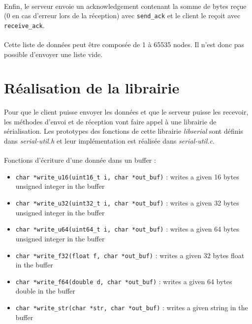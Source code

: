 \documentclass{article}
\begin{document}
    \paragraph{}
    Enfin, le serveur envoie un acknowledgement contenant la somme de bytes reçue (0 en cas d'erreur lors de la réception) avec \texttt{send\_ack} et le client le reçoit avec \texttt{receive\_ack}.

    \paragraph{}
    Cette liste de données peut être composée de 1 à 65535 nodes. Il n'est donc pas possible d'envoyer une liste vide.


    \section{Réalisation de la librairie}
    \paragraph{}
    Pour que le client puisse envoyer les données et que le serveur puisse les recevoir, les méthodes d'envoi et de réception vont faire appel à une librairie de sérialisation. Les prototypes des fonctions de cette librairie \emph{libserial} sont définis dans \emph{serial-util.h} et leur implémentation est réalisée dans \emph{serial-util.c}.

    \paragraph{}
    Fonctions d'écriture d'une donnée dans un buffer :
    \begin{itemize}
        \item \texttt{char *write\_u16(uint16\_t i, char *out\_buf)} : writes a given 16 bytes unsigned integer in the buffer
        \item \texttt{char *write\_u32(uint32\_t i, char *out\_buf)} : writes a given 32 bytes unsigned integer in the buffer
        \item \texttt{char *write\_u64(uint64\_t i, char *out\_buf)} : writes a given 64 bytes unsigned integer in the buffer
        \item \texttt{char *write\_f32(float f, char *out\_buf)} : writes a given 32 bytes float in the buffer
        \item \texttt{char *write\_f64(double d, char *out\_buf)} : writes a given 64 bytes double in the buffer
        \item \texttt{char *write\_str(char *str, char *out\_buf)} : writes a given string in the buffer
    \end{itemize}
\end{document}
